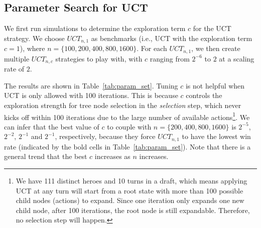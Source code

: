 \subsection{Parameter Search for UCT}

We first run simulations to determine the exploration term $c$ for the UCT strategy. We choose $UCT_{n, 1}$ as benchmarks (i.e., UCT with the exploration term ${c=1}$), where ${n=\{100, 200, 400, 800, 1600\}}$. For each $UCT_{n,1}$, we then create multiple $UCT_{n, c}$ strategies to play with, with $c$ ranging from $2^{-6}$ to $2$ at a scaling rate of $2$.

The results are shown in Table~\ref{tab:param_set}. Tuning $c$ is not helpful when UCT is only allowed with 100 iterations. This is because $c$ controls the exploration strength for tree node selection in the \textit{selection} step, which never kicks off within 100 iterations due to the large number of available actions\footnote{We have 111 distinct heroes and 10 turns in a draft, which means applying UCT at any turn will start from a root state with more than 100 possible child nodes (actions) to expand. Since one iteration only expands one new child node, after 100 iterations, the root node is still expandable. Therefore, no selection step will happen. }. We can infer that the best value of $c$ to couple with ${n=\{200, 400, 800, 1600\}}$ is $2^{-5}$, $2^{-2}$, $2^{-1}$ and $2^{-1}$, respectively, because they force $UCT_{n, 1}$ to have the lowest win rate (indicated by the bold cells in Table~\ref{tab:param_set}). Note that there is a general trend that the best $c$ increases as $n$ increases.



